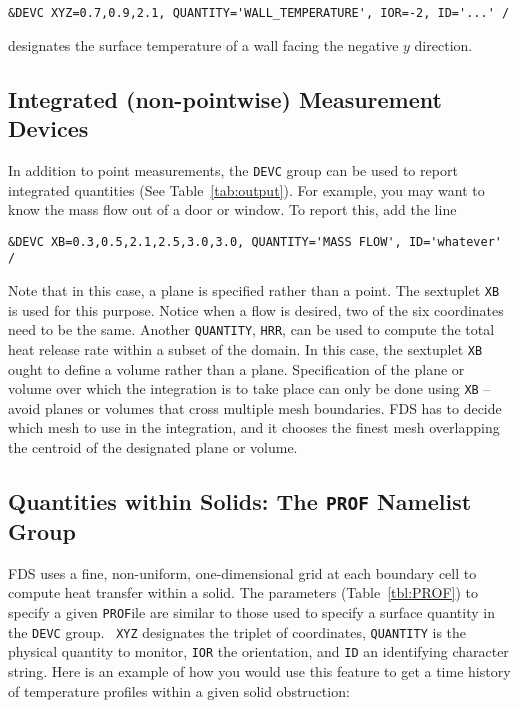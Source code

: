 \documentclass[11pt]{book}
\newcommand{\ct}{\tt\small}
\begin{document}
\footnotesize
\begin{verbatim}
&DEVC XYZ=0.7,0.9,2.1, QUANTITY='WALL_TEMPERATURE', IOR=-2, ID='...' /
\end{verbatim}
\normalsize

\noindent
designates the surface temperature of a wall facing the negative $y$
direction.



\subsection{Integrated (non-pointwise) Measurement Devices}
In addition to point measurements, the {\ct DEVC} group can be used
to report integrated quantities (See Table~\ref{tab:output}).
For example, you may want to know the mass flow out of a door or window.
To report this, add the line

\footnotesize
\begin{verbatim}
&DEVC XB=0.3,0.5,2.1,2.5,3.0,3.0, QUANTITY='MASS FLOW', ID='whatever' /
\end{verbatim}
\normalsize

\noindent
Note that in this case, a plane is specified rather than
a point. The sextuplet {\ct XB} is used for this purpose. Notice when a
flow is desired, two of the six coordinates need to be the same. Another
{\ct QUANTITY}, {\ct HRR}, can be used to compute the total heat release
rate within a subset of the domain. In this case, the sextuplet
{\ct XB} ought to define a volume rather than a plane. Specification of
the plane or volume over which the integration is to take place can only
be done using {\ct XB} -- avoid planes or volumes
that cross multiple mesh boundaries. FDS has to decide which mesh to
use in the integration, and it chooses the finest mesh overlapping
the centroid of the designated plane or volume.




\subsection{Quantities within Solids: The \texorpdfstring{{\tt PROF}}{PROF} Namelist Group}%
\label{info:PROF} 

FDS uses a fine, non-uniform, one-dimensional grid at each boundary
cell to compute heat transfer within a solid. The parameters
(Table~\ref{tbl:PROF}) to specify a given {\ct PROF}ile are similar to
those used to specify a surface quantity in the {\ct DEVC} group. {\ct
XYZ} designates the triplet of coordinates, {\ct QUANTITY} is the
physical quantity to monitor, {\ct IOR} the orientation,
and {\ct ID} an identifying character string. Here is an example of
how you would use this feature to get a time history of temperature
profiles within a given solid obstruction:
\end{document}
